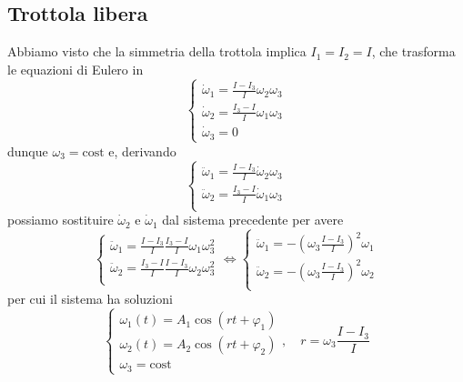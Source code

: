     \subsection{Trottola libera}
    Abbiamo visto che la simmetria della trottola implica $I_1=I_2=I$, che trasforma le equazioni di Eulero in
    \begin{equation}
        \begin{cases}
            \dot{\omega}_1 = \frac{I-I_3}{I}\omega_2\omega_3\\
            \dot{\omega}_2 = \frac{I_3-I}{I}\omega_1\omega_3\\
            \dot{\omega}_3 = 0
        \end{cases}
    \end{equation}
    dunque $\omega_3=\mathrm{cost}$ e, derivando
    \begin{equation}
        \begin{cases}
            \ddot{\omega}_1 = \frac{I-I_3}{I}\dot{\omega}_2\omega_3\\
            \ddot{\omega}_2 = \frac{I_3-I}{I}\dot{\omega}_1\omega_3\\
        \end{cases}
    \end{equation}
    possiamo sostituire $\dot{\omega}_2$ e $\dot{\omega}_1$ dal sistema precedente per avere
    \begin{equation}
        \begin{cases}
            \ddot{\omega}_1 = \frac{I-I_3}{I}\frac{I_3-I}{I}\omega_1\omega^2_3\\
            \ddot{\omega}_2 = \frac{I_3-I}{I}\frac{I-I_3}{I}\omega_2\omega^2_3\\
        \end{cases} \iff
        \begin{cases}
            \ddot{\omega}_1 = -\left(\omega_3\frac{I-I_3}{I}\right)^2\omega_1\\
            \ddot{\omega}_2 = -\left(\omega_3\frac{I-I_3}{I}\right)^2\omega_2\\
        \end{cases}
    \end{equation}
    per cui il sistema ha soluzioni
    \begin{equation}
        \begin{cases}
            \omega_1(t) = A_1\cos(rt+\varphi_1)\\
            \omega_2(t) = A_2\cos(rt+\varphi_2)\\
            \omega_3 = \mathrm{cost}
        \end{cases},\quad r=\omega_3\frac{I-I_3}{I}
    \end{equation}
